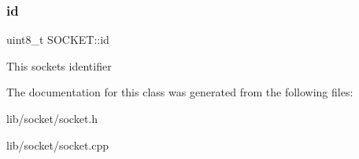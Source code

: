 \subsubsection{\texorpdfstring{id}{id}}
{\footnotesize\ttfamily uint8\+\_\+t S\+O\+C\+K\+E\+T\+::id\hspace{0.3cm}{\ttfamily [private]}}

This sockets identifier 

The documentation for this class was generated from the following files\+:\begin{DoxyCompactItemize}
\item 
lib/socket/socket.\+h\item 
lib/socket/socket.\+cpp\end{DoxyCompactItemize}
